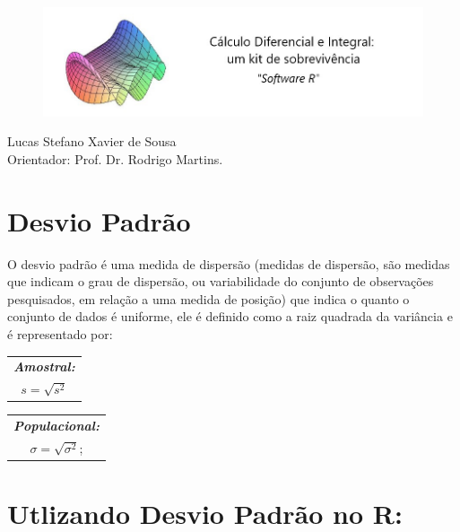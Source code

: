 \documentclass[12pt,a4paper]{article}
\begin{document}
	
\begin{figure}[htb]
\includegraphics[scale=0.6]{logo.jpg}
\end{figure}

	
	
	\begin{center}Lucas Stefano Xavier de Sousa \\ Orientador: Prof. Dr. Rodrigo Martins.\end{center}
	
	
	\vspace{2cm}
	
	\section*{Desvio Padrão}
	
	O desvio padrão é uma medida de dispersão (medidas de dispersão, são medidas  que indicam o grau de dispersão, ou variabilidade do conjunto de  observações pesquisados, em relação a uma medida de posição) que indica o quanto o conjunto de dados é uniforme, ele é definido como a raiz quadrada da variância e é representado por:\\
	
	\begin{center}
		\vspace{0.2cm}
		\begin{tabular}{|c|}
			\hline
			\textit{\textbf{Amostral:}} \\
			$s= \sqrt{s^2}$\\
			\hline
		\end{tabular}
	\end{center}
	

	\begin{center}
		\begin{tabular}{|c|}
			\hline
			\textit{\textbf{Populacional:}} \\
			$	\sigma= \sqrt{\sigma^2}$;\\
			\hline
		\end{tabular}
	\end{center}
	
	\section*{Utlizando Desvio Padrão no R:}
	
\end{document}
